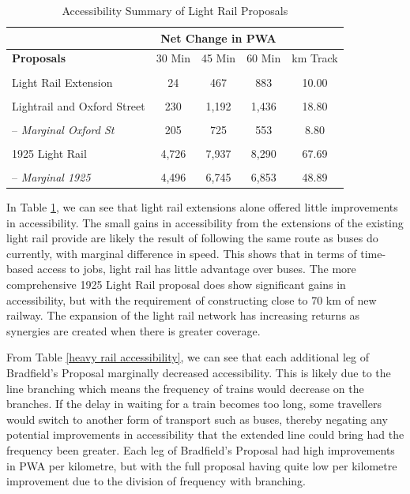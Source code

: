 \documentclass[preprint,12pt,authoryear]{elsarticle}
\begin{document}
\begin{table}[H]
\centering
 
\caption{Accessibility Summary of Light Rail Proposals}\label{lightrail accessibility}

\begin{tabular}{p{4cm}cccc}
    \toprule 
    & \multicolumn{3}{c}{Net Change in PWA}& \\
    \midrule

    \textbf{Proposals}& 30 Min& 45 Min& 60 Min &km Track \\
    \midrule
 & & &  & \\
 Light Rail Extension& 24& 467& 883&10.00
 \\
 & & & & \\
 Lightrail and Oxford Street & 230& 1,192& 1,436&18.80
 \\
 & & & & \\
 -- \textit{Marginal Oxford St}& 205& 725&553&8.80
 \\
 & & & & \\
 1925 Light Rail& 4,726& 7,937&8,290&67.69
 \\
 & & & & \\
 -- \textit{Marginal 1925 }& 4,496& 6,745&6,853&48.89
 \\
      \bottomrule
\end{tabular}
\end{table}





In Table \ref{lightrail accessibility}, we can see that light rail extensions alone offered little improvements in accessibility. The small gains in accessibility from the extensions of the existing light rail provide are likely the result of following the same route as buses do currently, with marginal difference in speed. This shows that in terms of time-based access to jobs, light rail has little advantage over buses. The more comprehensive 1925 Light Rail proposal does show significant gains in accessibility, but with the requirement of constructing close to 70 km of new railway. The expansion of the light rail network has increasing returns as synergies are created when there is greater coverage.

From Table \ref{heavy rail accessibility}, we can see that each additional leg of Bradfield's Proposal marginally decreased accessibility. This is likely due to the line branching which means the frequency of trains would decrease on the branches. If the delay in waiting for a train becomes too long, some travellers would switch to another form of transport such as buses, thereby negating any potential improvements in accessibility that the extended line could bring had the frequency been greater. Each leg of Bradfield's Proposal had high improvements in PWA per kilometre, but with the full proposal having quite low per kilometre improvement due to the division of frequency with branching.
\end{document}
